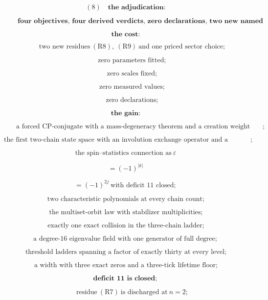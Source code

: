 \documentclass[11pt,openany]{report}
\theoremstyle{canonplain}
\theoremstyle{canondef}
\begin{document}
\[
(8)\quad\textbf{the adjudication:}
\]

\[
\qquad \boxed{\ \textbf{four objectives, four derived verdicts, zero declarations, two new named residues}\ }
\]

\[
\textbf{the cost:}
\]

\[
\qquad \text{two new residues}\ (\mathrm{R8}),\ (\mathrm{R9})\ \text{and one priced sector choice};
\]

\[
\qquad \text{zero parameters fitted};
\]

\[
\qquad \text{zero scales fixed};
\]

\[
\qquad \text{zero measured values};
\]

\[
\qquad \text{zero declarations};
\]

\[
\textbf{the gain:}
\]

\[
\qquad \text{a forced CP-conjugate with a mass-degeneracy theorem and a creation weight whose maximum is exactly one quarter};
\]

\[
\ \text{the first two-chain state space with an involution exchange operator and a permutation-sign read};
\]

\[
\text{the spin--statistics connection as}\ \varepsilon
\]

\[
= (-1)^{|k|}
\]

\[
= (-1)^{2j}\ \text{with deficit 11 closed};
\]

\[
\ \text{two characteristic polynomials at every chain count};
\]

\[
\ \text{the multiset-orbit law with stabilizer multiplicities};
\]

\[
\ \text{exactly one exact collision in the three-chain ladder};
\]

\[
\text{a degree-16 eigenvalue field with one generator of full degree};
\]

\[
\ \text{threshold ladders spanning a factor of exactly thirty at every level};
\]

\[
\ \text{a width with three exact zeros and a three-tick lifetime floor};
\]

\[
\textbf{deficit 11 is closed};
\]

\[
\qquad \text{residue}\ (\mathrm{R7})\ \text{is discharged at}\ n=2;
\]
\end{document}
